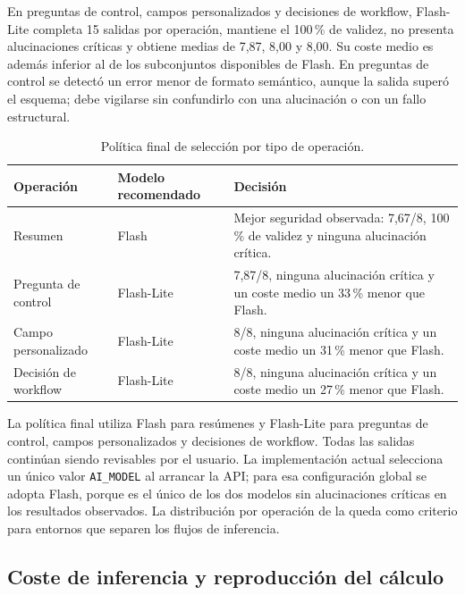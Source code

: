 En preguntas de control, campos personalizados y decisiones de workflow,
Flash-Lite completa 15 salidas por operación, mantiene el 100\,\% de validez,
no presenta alucinaciones críticas y obtiene medias de 7,87, 8,00 y 8,00. Su
coste medio es además inferior al de los subconjuntos disponibles de Flash. En
preguntas de control se detectó un error menor de formato semántico, aunque la
salida superó el esquema; debe vigilarse sin confundirlo con una alucinación o
con un fallo estructural.

\begin{table}[H]
  \centering
  \small
  \caption{Política final de selección por tipo de operación.}
  \label{tab:ai-model-decision}
  \begin{tabular}{@{}p{3.2cm}p{3.0cm}p{6.1cm}@{}}
    \toprule
    \textbf{Operación} & \textbf{Modelo recomendado} & \textbf{Decisión} \\
    \midrule
    Resumen & Flash & Mejor seguridad observada: 7,67/8, 100\,\% de validez y ninguna alucinación crítica. \\
    Pregunta de control & Flash-Lite & 7,87/8, ninguna alucinación crítica y un coste medio un 33\,\% menor que Flash. \\
    Campo personalizado & Flash-Lite & 8/8, ninguna alucinación crítica y un coste medio un 31\,\% menor que Flash. \\
    Decisión de workflow & Flash-Lite & 8/8, ninguna alucinación crítica y un coste medio un 27\,\% menor que Flash. \\
    \bottomrule
  \end{tabular}
\end{table}

La política final utiliza Flash para resúmenes y Flash-Lite para preguntas de
control, campos personalizados y decisiones de workflow. Todas las salidas
continúan siendo revisables por el usuario. La implementación actual selecciona
un único valor \texttt{AI\_MODEL} al arrancar la API; para esa configuración
global se adopta Flash, porque es el único de los dos modelos sin alucinaciones
críticas en los resultados observados. La distribución por operación de la
 queda como criterio para entornos que separen los
flujos de inferencia.

\subsection{Coste de inferencia y reproducción del cálculo}
\label{sec:ai-inference-cost}

